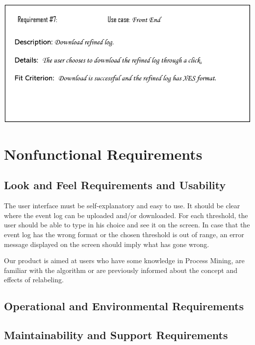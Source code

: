 \documentclass[notitlepage]{article}
\begin{document}
\begin{flushleft}
\includegraphics[scale=0.6]{Req7.png}




\section{Nonfunctional Requirements}

\subsection{Look and Feel Requirements and Usability}
The user interface must be self-explanatory and easy to use.
It should be clear where the event log can be uploaded and/or downloaded.
For each threshold, the user should be able to type in his choice and see it on the screen.
In case that the event log has the wrong format or the chosen threshold is out of range, an error message displayed on the screen should imply what has gone wrong.

Our product is aimed at users who have some knowledge in Process Mining, are familiar with the algorithm or are previously informed about the concept and effects of relabeling.





\subsection{Operational and Environmental Requirements}

\subsection{Maintainability and Support Requirements}




\end{flushleft}
\end{document}
